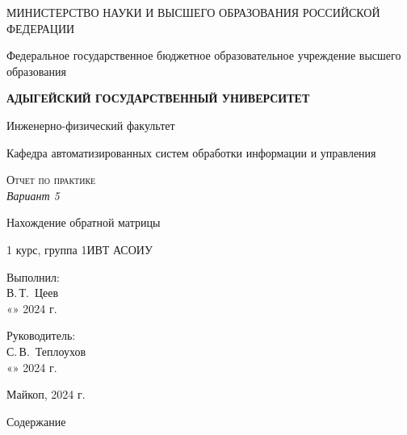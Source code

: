 \documentclass[12pt,a4paper]{scrartcl}
\begin{document}
	\begin{titlepage}
		\begin{center}
			\large
			МИНИСТЕРСТВО НАУКИ И ВЫСШЕГО ОБРАЗОВАНИЯ РОССИЙСКОЙ ФЕДЕРАЦИИ
			
			Федеральное государственное бюджетное образовательное учреждение высшего образования
			
			\textbf{АДЫГЕЙСКИЙ ГОСУДАРСТВЕННЫЙ УНИВЕРСИТЕТ}
			\vspace{0.25cm}
			
			Инженерно-физический факультет
			
			Кафедра автоматизированных систем обработки информации и управления
			\vfill

			\vfill
			
			\textsc{Отчет по практике}\\[5mm]
			
			\LARGE\textit{Вариант 5}
			
			{\LARGE Нахождение обратной матрицы}
			\bigskip
			
			1 курс, группа 1ИВТ АСОИУ
		\end{center}
		\vfill
		
		\newlength{\ML}
		\hfill\begin{minipage}{0.5\textwidth}
			Выполнил:\\
			\underline{\hspace{\ML}} В.\,Т.~Цеев\\
			«\underline{\hspace{0.7cm}}» \underline{\hspace{2cm}} 2024 г.
		\end{minipage}%
		\bigskip
		
		\hfill\begin{minipage}{0.5\textwidth}
			Руководитель:\\
			\underline{\hspace{\ML}} С.\,В.~Теплоухов\\
			«\underline{\hspace{0.7cm}}» \underline{\hspace{2cm}} 2024 г.
		\end{minipage}%
		
		
		\vfill
		
		
		
		\begin{center}
			
			Майкоп, 2024 г.
		\end{center}
	\end{titlepage}
\LARGE{Содержание}
\end{document}
